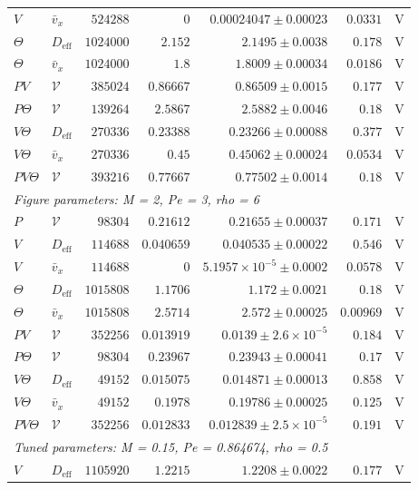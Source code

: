 \begin{longtable}{llrrrrc}
$V$ & $\bar v_x$ & $524288$ & $0$ & $0.00024047 \pm 0.00023$ & $0.0331$ & V \\
$\Theta$ & $D_{\mathrm{eff}}$ & $1024000$ & $2.152$ & $2.1495 \pm 0.0038$ & $0.178$ & V \\
$\Theta$ & $\bar v_x$ & $1024000$ & $1.8$ & $1.8009 \pm 0.00034$ & $0.0186$ & V \\
$PV$ & $\mathcal V$ & $385024$ & $0.86667$ & $0.86509 \pm 0.0015$ & $0.177$ & V \\
$P\Theta$ & $\mathcal V$ & $139264$ & $2.5867$ & $2.5882 \pm 0.0046$ & $0.18$ & V \\
$V\Theta$ & $D_{\mathrm{eff}}$ & $270336$ & $0.23388$ & $0.23266 \pm 0.00088$ & $0.377$ & V \\
$V\Theta$ & $\bar v_x$ & $270336$ & $0.45$ & $0.45062 \pm 0.00024$ & $0.0534$ & V \\
$PV\Theta$ & $\mathcal V$ & $393216$ & $0.77667$ & $0.77502 \pm 0.0014$ & $0.18$ & V \\
\multicolumn{7}{l}{\textit{Figure parameters: M = 2, Pe = 3, rho = 6}} \\
$P$ & $\mathcal V$ & $98304$ & $0.21612$ & $0.21655 \pm 0.00037$ & $0.171$ & V \\
$V$ & $D_{\mathrm{eff}}$ & $114688$ & $0.040659$ & $0.040535 \pm 0.00022$ & $0.546$ & V \\
$V$ & $\bar v_x$ & $114688$ & $0$ & $5.1957\times10^{-5} \pm 0.0002$ & $0.0578$ & V \\
$\Theta$ & $D_{\mathrm{eff}}$ & $1015808$ & $1.1706$ & $1.172 \pm 0.0021$ & $0.18$ & V \\
$\Theta$ & $\bar v_x$ & $1015808$ & $2.5714$ & $2.572 \pm 0.00025$ & $0.00969$ & V \\
$PV$ & $\mathcal V$ & $352256$ & $0.013919$ & $0.0139 \pm 2.6\times10^{-5}$ & $0.184$ & V \\
$P\Theta$ & $\mathcal V$ & $98304$ & $0.23967$ & $0.23943 \pm 0.00041$ & $0.17$ & V \\
$V\Theta$ & $D_{\mathrm{eff}}$ & $49152$ & $0.015075$ & $0.014871 \pm 0.00013$ & $0.858$ & V \\
$V\Theta$ & $\bar v_x$ & $49152$ & $0.1978$ & $0.19786 \pm 0.00025$ & $0.125$ & V \\
$PV\Theta$ & $\mathcal V$ & $352256$ & $0.012833$ & $0.012839 \pm 2.5\times10^{-5}$ & $0.191$ & V \\
\multicolumn{7}{l}{\textit{Tuned parameters: M = 0.15, Pe = 0.864674, rho = 0.5}} \\
$V$ & $D_{\mathrm{eff}}$ & $1105920$ & $1.2215$ & $1.2208 \pm 0.0022$ & $0.177$ & V \\

\end{longtable}
